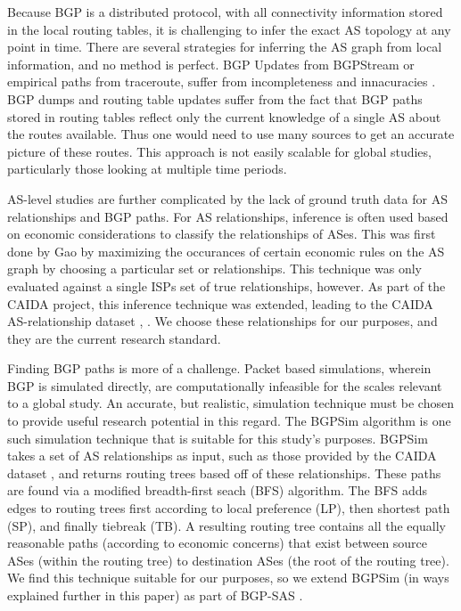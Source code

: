 \documentclass[10pt, conference, letterpaper]{IEEEtran}
\newcommand{\toolname}{BGP-SAS }
\begin{document}
Because BGP is a distributed protocol, with all connectivity
information stored in the local routing tables, it is challenging to
infer the exact AS topology at any point in time.  There are several
strategies for inferring the AS graph from local information, and no method is perfect.  
BGP Updates from BGPStream \cite{BGPStream} or empirical paths from traceroute, suffer from
incompleteness and innacuracies \cite{tracerouteProblems}. BGP dumps and routing table updates
suffer from the fact that BGP paths stored in routing tables reflect only the current knowledge of
a single AS about the routes available. Thus one would need to use many sources to get an accurate picture of
these routes. This approach is not easily scalable for global studies, particularly those looking at multiple time periods.
\par
AS-level studies are further complicated by the lack of ground truth data for AS relationships and BGP paths. For AS relationships,
inference is often used based on economic considerations to classify the relationships of ASes. This was first done by Gao \cite{gao} by
maximizing the occurances of certain economic rules on the AS graph by choosing a particular set or relationships. This technique was only
evaluated against a single ISPs set of true relationships, however. As part of the CAIDA project, this inference technique was extended, leading
to the CAIDA AS-relationship dataset \cite{CAIDApaper}, \cite{CAIDA}. We choose these relationships for our purposes, and they are the current
research standard.
\par
Finding BGP paths is more of a challenge. Packet based simulations, wherein BGP is simulated directly, are computationally infeasible for the
scales relevant to a global study. An accurate, but realistic, simulation technique must be chosen to provide useful research potential in this regard.
The BGPSim algorithm \cite{quicksand} is one such simulation technique that is suitable for this study's purposes. BGPSim takes a set of AS relationships
as input, such as those provided by the CAIDA dataset \cite{CAIDA}, and returns routing trees based off of these relationships. These paths are found via
a modified breadth-first seach (BFS) algorithm. The BFS adds edges to routing trees first according to local preference (LP), then shortest path (SP), and finally tiebreak (TB).
A resulting routing tree contains all the equally reasonable paths (according to economic concerns) that exist between source ASes (within the routing tree) to 
destination ASes (the root of the routing tree). We find this technique suitable for our purposes, so we extend BGPSim 
(in ways explained further in this paper) as part of \toolname.
\end{document}

